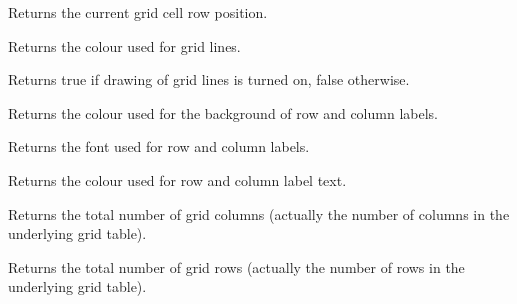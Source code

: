 \label{wxgridgetgridcursorrow}


Returns the current grid cell row position.

\label{wxgridgetgridlinecolour}


Returns the colour used for grid lines.

\label{wxgridgridlinesenabled}


Returns true if drawing of grid lines is turned on, false otherwise.

\label{wxgridgetlabelbackgroundcolour}


Returns the colour used for the background of row and column labels.

\label{wxgridgetlabelfont}


Returns the font used for row and column labels.

\label{wxgridgetlabeltextcolour}


Returns the colour used for row and column label text.

\label{wxgridgetnumbercols}


Returns the total number of grid columns (actually the number of columns in the underlying grid
table).

\label{wxgridgetnumberrows}


Returns the total number of grid rows (actually the number of rows in the underlying grid table).

\label{wxgridgetrowlabelalignment}


